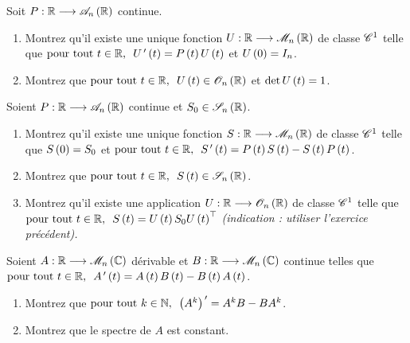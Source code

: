 \begin{exoss}
Soit \(P:\R\to\antisym{n}[\R]\) continue.

\begin{enumerate}
    \item Montrez qu'il existe une unique fonction \(U:\R\to\M{n}[\R]\) de classe \(\mathscr{C}^{1}\) telle que \(\quantifs{\tpt t\in\R}U\prim\paren{t}=P\paren{t}U\paren{t}\) et \(U\left(0\right)=I_n\). \\
    \item Montrez que \(\quantifs{\tpt t\in\R}U\paren{t}\in\Orth{n}[\R]\) et \(\det U\left(t\right)=1\).
\end{enumerate}
\end{exoss}

\begin{exoss}
Soient \(P:\R\to\antisym{n}[\R]\) continue et \(S_0\in\sym{n}[\R]\).

\begin{enumerate}
    \item Montrez qu'il existe une unique fonction \(S:\R\to\M{n}[\R]\) de classe \(\mathscr{C}^{1}\) telle que \(S\left(0\right)=S_0\) et \(\quantifs{\tpt t\in\R}S\prim\paren{t}=P\paren{t}S\paren{t}-S\paren{t}P\paren{t}\). \\
    \item Montrez que \(\quantifs{\tpt t\in\R}S\paren{t}\in\sym{n}[\R]\). \\
    \item Montrez qu'il existe une application \(U:\R\to\Orth{n}[\R]\) de classe \(\mathscr{C}^{1}\) telle que \(\quantifs{\tpt t\in\R}S\paren{t}=U\paren{t}S_0\trans{U\paren{t}}\) \textit{(indication : utiliser l'exercice précédent).}
\end{enumerate}
\end{exoss}

\begin{exoss}
Soient \(A:\R\to\M{n}[\C]\) dérivable et \(B:\R\to\M{n}[\C]\) continue telles que \(\quantifs{\tpt t\in\R}A\prim\paren{t}=A\paren{t}B\paren{t}-B\paren{t}A\paren{t}\).

\begin{enumerate}
    \item Montrez que \(\quantifs{\tpt k\in\N}\paren{A^k}\prim=A^kB-BA^k\). \\
    \item Montrez que le spectre de \(A\) est constant.
\end{enumerate}
\end{exoss}

